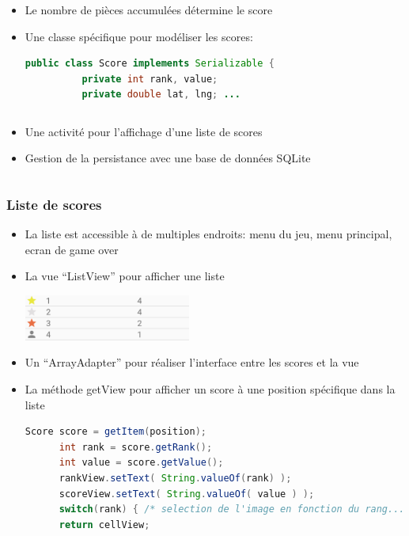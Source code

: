 \documentclass[handout]{beamer}
\begin{document}
\begin{frame}[fragile]
  \frametitle<1->{}
    \begin{column}
      \begin{itemize}
        \item <1->{Le nombre de pièces accumulées détermine le score}
        \item <2->{Une classe spécifique pour modéliser les scores:}
        \begin{lstlisting}[language=java]
          public class Score implements Serializable {
          private int rank, value;
          private double lat, lng; ...
        \end{lstlisting}
      \end{itemize}
    \end{column}
    \begin{column}
      \begin{itemize}
        \item <3->{Une activité pour l'affichage d'une liste de scores}
        \item <2->{Gestion de la persistance avec une base de données SQLite}
      \end{itemize}
    \end{column}
\end{frame}

\begin{frame}[fragile]
  \frametitle<1->{Liste de scores}
  \begin{itemize}
    \item <1->{La liste est accessible à de multiples endroits: menu du jeu, menu principal, ecran de game over}
    \item <2->{La vue \enquote{ListView} pour afficher une liste}
    \begin{center}
      \includegraphics[height=15mm]{scores_list.png}
    \end{center}
    \item <3->{Un \enquote{ArrayAdapter} pour réaliser l'interface entre les scores et la vue}%
    \item <4->{La méthode getView pour afficher un score à une position spécifique dans la liste}
    \begin{lstlisting}[language=java]
      Score score = getItem(position);
      int rank = score.getRank();
      int value = score.getValue();
      rankView.setText( String.valueOf(rank) );
      scoreView.setText( String.valueOf( value ) );
      switch(rank) { /* selection de l'image en fonction du rang... */ }
      return cellView;
    \end{lstlisting}
  \end{itemize}
\end{frame}
\end{document}
